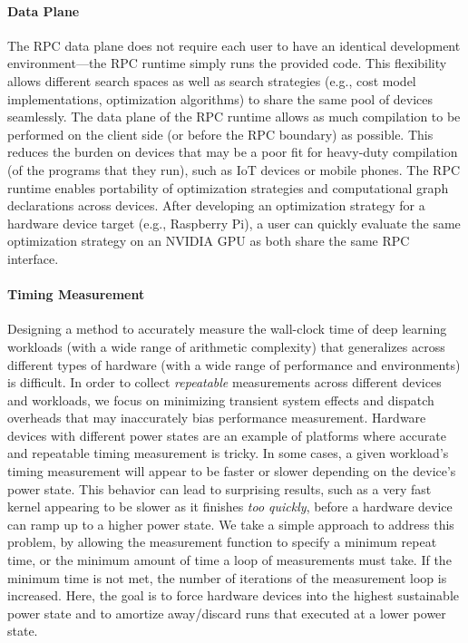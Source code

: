 \paragraph{Data Plane}
The RPC data plane does not require each user to have an identical development environment---the RPC runtime simply runs the provided code.
This flexibility allows different search spaces as well as search strategies (e.g., cost model implementations, optimization algorithms) to share the same pool of devices seamlessly.
The data plane of the RPC runtime allows as much compilation to be performed on the client side (or before the RPC boundary) as possible.
This reduces the burden on devices that may be a poor fit for heavy-duty compilation (of the programs that they run), such as IoT devices or mobile phones.
The RPC runtime enables portability of optimization strategies and computational graph declarations across devices.
After developing an optimization strategy for a hardware device target (e.g., Raspberry Pi), a user can quickly evaluate the same optimization strategy on an NVIDIA GPU as both share the same RPC interface.

\paragraph{Timing Measurement}
Designing a method to accurately measure the wall-clock time of deep learning workloads (with a wide range of arithmetic complexity) that generalizes across different types of hardware (with a wide range of performance and environments) is difficult.
In order to collect \emph{repeatable} measurements across different devices and workloads, we focus on minimizing transient system effects and dispatch overheads that may inaccurately bias performance measurement.
Hardware devices with different power states are an example of platforms where accurate and repeatable timing measurement is tricky.
In some cases, a given workload's timing measurement will appear to be faster or slower depending on the device's power state.
This behavior can lead to surprising results, such as a very fast kernel appearing to be slower as it finishes \emph{too quickly}, before a hardware device can ramp up to a higher power state.
We take a simple approach to address this problem, by allowing the measurement function to specify a minimum repeat time, or the minimum amount of time a loop of measurements must take.
If the minimum time is not met, the number of iterations of the measurement loop is increased.
Here, the goal is to force hardware devices into the highest sustainable power state and to amortize away/discard runs that executed at a lower power state.

